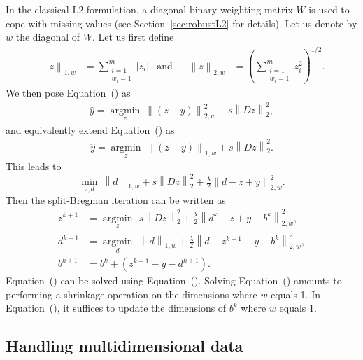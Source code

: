 \documentclass[preprint]{imsart}
\newcommand{\argmin}[1]{\underset{#1}{\operatorname{argmin}}\ }
\newcommand{\norm}[2]{\left\| #1 \right\|_{#2}}
\begin{document}
In the classical L2 formulation, a diagonal binary weighting matrix $W$ is used to cope with missing values (see Section~\ref{sec:robustL2} for details). Let us denote by $w$ the diagonal of $W$. Let us first define
\begin{align}
    \norm{z}{1, w} &= \sum_{\substack{i=1 \\ w_i = 1}}^{m} |z_i|
    & \text{and} &&
    \norm{z}{2, w} &= \left( \sum_{\substack{i=1 \\ w_i = 1}}^{m} z_i^2 \right)^{1/2} .
\end{align}
We then pose Equation~() as
\begin{gather}
    \hat{y} = \argmin{z} \norm{(z - y)}{2, w}^2 + s \norm{Dz}{2}^ 2 ,
\end{gather}
and equivalently extend Equation~() as
\begin{gather}
    \hat{y} = \argmin{z} \norm{(z - y)}{1, w} + s \norm{Dz}{2}^ 2 .
\end{gather}
This leads to
\begin{equation}
    \min_{z, d} \ \norm{d}{1, w} + s \norm{Dz}{2}^ 2 + \tfrac{\lambda}{2} \norm{d - z + y}{2, w}^2 .
\end{equation}
Then the split-Bregman iteration can be written as
\begin{align}
    z^{k+1} &= \argmin{z} \, s \norm{Dz}{2}^ 2 + \tfrac{\lambda}{2} \norm{d^k - z + y - b^k}{2,w}^2 , \label{eq:WsplitBregman1_1} \\
    d^{k+1} &= \argmin{d} \, \norm{d}{1,w} + \tfrac{\lambda}{2} \norm{d - z^{k+1} + y - b^k}{2,w}^2 , \label{eq:WsplitBregman1_2} \\
    b^{k+1} &= b^k + (z^{k+1} - y - d^{k+1}) . \label{eq:WsplitBregman2}
\end{align}
Equation~() can be solved using Equation~(). Solving Equation~() amounts to performing a shrinkage operation on the dimensions where $w$ equals 1. In Equation~(), it suffices to update the dimensions of $b^k$ where $w$ equals 1.

\subsection{Handling multidimensional data}
\end{document}

